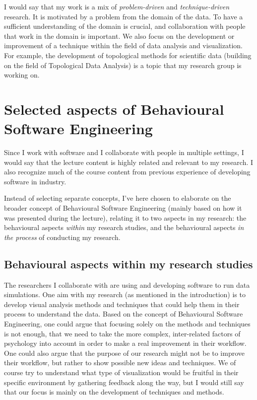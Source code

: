 \documentclass[11pt]{article}
\begin{document}
I would say that my work is a mix of \emph{problem-driven} and \emph{technique-driven} research. It is motivated by a problem from the domain of the data.
To have a sufficient understanding of the domain is crucial, and collaboration with people that work in the domain is important.
We also focus on the development or improvement of a technique within the field of data analysis and visualization. For example, the development of topological methods for scientific data (building on the field of Topological Data Analysis) is a topic that my research group is working on.



\section{Selected aspects of Behavioural Software Engineering}

Since I work with software and I collaborate with people in multiple settings, I would say that the lecture content is highly related and relevant to my research. 
I also recognize much of the course content from previous experience of developing software in industry.

Instead of selecting separate concepts, I've here chosen to elaborate on the broader concept of Behavioural Software Engineering \cite{lenberg2015behavioral} (mainly based on how it was presented during the lecture), relating it to two aspects in my research:
 the behavioural aspects \emph{within} my research studies, and the behavioural aspects \emph{in the process} of conducting my research.


\subsection{Behavioural aspects within my research studies}

The researchers I collaborate with are using and developing software to run data simulations. One aim with my research (as mentioned in the introduction) is to develop visual analysis methods and techniques that could help them in their process to understand the data.
Based on the concept of Behavioural Software Engineering, one could argue that focusing solely on the methods and techniques is not enough, that we need to take the more complex, inter-related factors of psychology into account in order to make a real improvement in their workflow. 
One could also argue that the purpose of our research might not be to improve their workflow, but rather to show possible new ideas and techniques.
We of course try to understand what type of visualization would be fruitful in their specific environment by gathering feedback along the way, but I would still say that our focus is mainly on the development of techniques and methods. 
\end{document}
